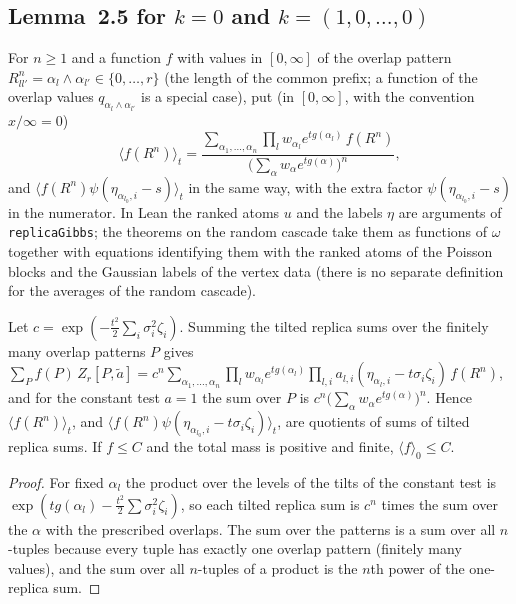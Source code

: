 \subsection*{Lemma~2.5 for $k=0$ and $k=(1,0,\dots,0)$}

\begin{definition}\label{def:sg:cascade-gibbs}
  \leanok
For $n\ge1$ and a function $f$ with values in $[0,\infty]$ of the overlap pattern $R^n_{ll'}=\alpha_l\wedge\alpha_{l'}\in\{0,\dots,r\}$ (the length of the
common prefix; a function of the overlap values $q_{\alpha_l\wedge\alpha_{l'}}$ is a special case), put (in $[0,\infty]$, with the convention $x/\infty=0$)
\[
 \langle f(R^n)\rangle_t=\frac{\sum_{\alpha_1,\dots,\alpha_n}\prod_lw_{\alpha_l}e^{tg(\alpha_l)}\,f(R^n)}{\big(\sum_\alpha w_\alpha e^{tg(\alpha)}\big)^n},
\]
and $\langle f(R^n)\psi(\eta_{\alpha_{l_0},i}-s)\rangle_t$ in the same way, with the extra factor $\psi(\eta_{\alpha_{l_0},i}-s)$ in the numerator.
In Lean the ranked atoms $u$ and the labels $\eta$ are arguments of \texttt{replicaGibbs}; the theorems on the random cascade take them as functions of $\omega$
together with equations identifying them with the ranked atoms of the Poisson blocks and the Gaussian labels of the vertex data (there is no separate definition for
the averages of the random cascade).
\end{definition}

\begin{theorem}\label{thm:sg:gibbs-ratio}
  \leanok
Let $c=\exp(-\tfrac{t^2}{2}\sum_i\sigma_i^2\zeta_i)$. Summing the tilted replica sums over the finitely many overlap patterns $P$ gives
$\sum_Pf(P)\,Z_r[P,\tilde a]=c^n\sum_{\alpha_1,\dots,\alpha_n}\prod_lw_{\alpha_l}e^{tg(\alpha_l)}\prod_{l,i}a_{l,i}(\eta_{\alpha_l,i}-t\sigma_i\zeta_i)\,f(R^n)$,
and for the constant test $a=1$ the sum over $P$ is $c^n\big(\sum_\alpha w_\alpha e^{tg(\alpha)}\big)^n$. Hence
$\langle f(R^n)\rangle_t$, and $\langle f(R^n)\psi(\eta_{\alpha_{l_0},i}-t\sigma_i\zeta_i)\rangle_t$, are quotients of sums of tilted replica sums. If $f\le C$ and the total mass is positive and finite,
$\langle f\rangle_0\le C$.
\end{theorem}
\begin{proof}
  \leanok
For fixed $\alpha_l$ the product over the levels of the tilts of the constant test is $\exp(tg(\alpha_l)-\tfrac{t^2}2\sum\sigma_i^2\zeta_i)$, so each tilted
replica sum is $c^n$ times the sum over the $\alpha$ with the prescribed overlaps. The sum over the patterns is a sum over all $n$-tuples because every
tuple has exactly one overlap pattern (finitely many values), and the sum over all $n$-tuples of a product is the $n$th power of the one-replica sum.
\end{proof}

